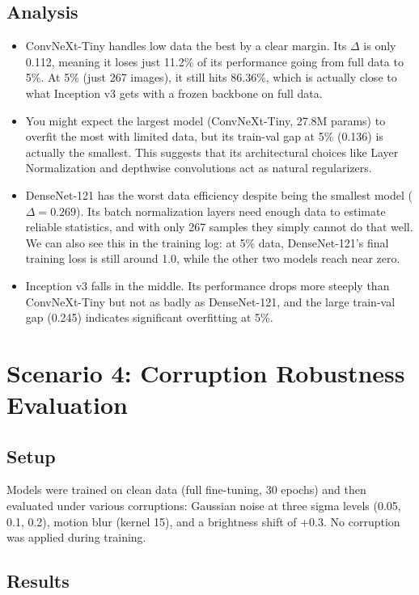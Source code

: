 \documentclass[11pt,a4paper]{article}
\begin{document}
\subsection{Analysis}

\begin{itemize}
  \item ConvNeXt-Tiny handles low data the best by a clear margin. Its $\Delta$ is only 0.112, meaning it loses just 11.2\% of its performance going from full data to 5\%. At 5\% (just 267 images), it still hits 86.36\%, which is actually close to what Inception v3 gets with a frozen backbone on full data.
  \item You might expect the largest model (ConvNeXt-Tiny, 27.8M params) to overfit the most with limited data, but its train-val gap at 5\% (0.136) is actually the smallest. This suggests that its architectural choices like Layer Normalization and depthwise convolutions act as natural regularizers.
  \item DenseNet-121 has the worst data efficiency despite being the smallest model ($\Delta = 0.269$). Its batch normalization layers need enough data to estimate reliable statistics, and with only 267 samples they simply cannot do that well. We can also see this in the training log: at 5\% data, DenseNet-121's final training loss is still around 1.0, while the other two models reach near zero.
  \item Inception v3 falls in the middle. Its performance drops more steeply than ConvNeXt-Tiny but not as badly as DenseNet-121, and the large train-val gap (0.245) indicates significant overfitting at 5\%.
\end{itemize}

\section{Scenario 4: Corruption Robustness Evaluation}
\label{sec:s4}

\subsection{Setup}
Models were trained on clean data (full fine-tuning, 30 epochs) and then evaluated under various corruptions: Gaussian noise at three sigma levels (0.05, 0.1, 0.2), motion blur (kernel 15), and a brightness shift of +0.3. No corruption was applied during training.

\subsection{Results}
\end{document}
